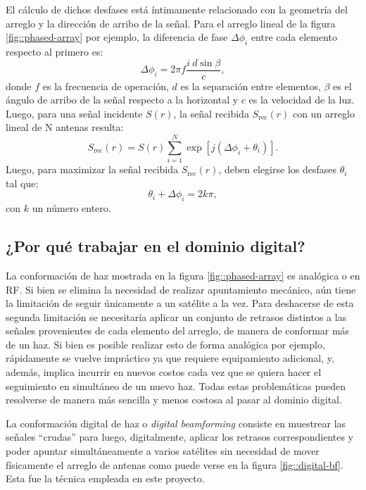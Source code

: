 \documentclass[../../main.tex]{subfiles}
\begin{document}
El cálculo de dichos desfases está íntimamente relacionado con la geometría del arreglo y la dirección de arribo de la señal. Para el arreglo lineal de la figura \ref{fig::phased-array} por ejemplo, la diferencia de fase $\Delta \phi_i$ entre cada elemento respecto al primero es:
\begin{equation}
    \Delta \phi_i = 2 \pi f \frac{i \ d \sin{\beta}}{c},
\end{equation} 
donde $f$ es la frecuencia de operación, $d$ es la separación entre elementos, $\beta$ es el ángulo de arribo de la señal respecto a la horizontal y $c$ es la velocidad de la luz. Luego, para una señal incidente $S(r)$, la señal recibida $S_{\textrm{rec}}(r)$ con un arreglo lineal de N antenas resulta:
\begin{equation}
    S_{\textrm{rec}}(r) = S(r) \sum_{i=1}^{N} \exp[{j (\Delta \phi_i + \theta_i)}].
\end{equation}
Luego, para maximizar la señal recibida $S_{\textrm{rec}}(r)$, deben elegirse los desfases $\theta_i$ tal que:
\begin{equation}
    \theta_i + \Delta \phi_i = 2 k \pi,
\end{equation}
con $k$ un número entero.


\subsection{¿Por qué trabajar en el dominio digital?}

La conformación de haz mostrada en la figura \ref{fig::phased-array} es analógica o en RF. Si bien se elimina la necesidad de realizar apuntamiento mecánico, aún tiene la limitación de seguir únicamente a un satélite a la vez. Para deshacerse de esta segunda limitación se necesitaría aplicar un conjunto de retrasos distintos a las señales provenientes de cada elemento del arreglo, de manera de conformar más de un haz.
Si bien es posible realizar esto de forma analógica por ejemplo, rápidamente se vuelve impráctico ya que requiere equipamiento adicional, y, además, implica incurrir en nuevos costos cada vez que se quiera hacer el seguimiento en simultáneo de un nuevo haz.
Todas estas problemáticas pueden resolverse de manera más sencilla y menos costosa al pasar al dominio digital. 

La conformación digital de haz o \textit{digital beamforming} consiste en muestrear las señales ``crudas'' para luego, digitalmente, aplicar los retrasos correspondientes y poder apuntar simultáneamente a varios satélites sin necesidad de mover físicamente el arreglo de antenas como puede verse en la figura \ref{fig::digital-bf}. Esta fue la técnica empleada en este proyecto.
\end{document}
